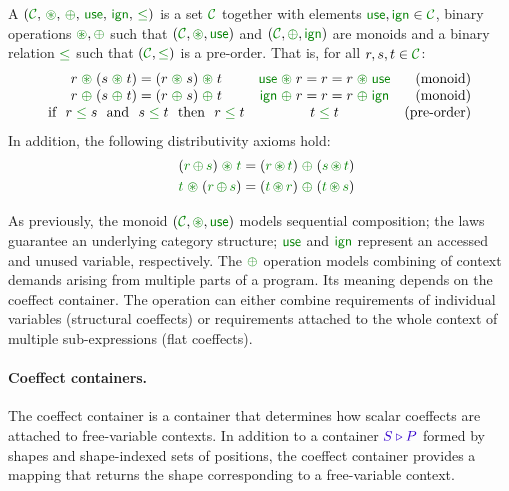 \begin{definition}
\label{def:unified-scal}
A \emph{} $(\C, \,\cseq, \,\cpar, \,\cunit, \,\czero, \,\cleq)$ is a set
$\C$ together with elements $\cunit, \czero \in \C$, binary operations $\cseq, \cpar$ such that
$(\C, \cseq, \cunit)$ and $(\C, \cpar, \czero)$ are monoids and a binary relation $\cleq$ such
that $(\C, \cleq)$ is a pre-order. That is, for all $r,s,t\in \C$:
%
\begin{equation*}
\begin{array}{ccr}
r \;\cseq\; (s \;\cseq\; t) = (r \;\cseq\; s) \;\cseq\; t  &
\cunit \;\cseq\; r = r = r \;\cseq\; \cunit &
\textnormal{(monoid)}
\\
r \;\cpar\; (s \;\cpar\; t) = (r \;\cpar\; s) \;\cpar\; t &
\czero \;\cpar\; r = r = r \;\cpar\; \czero &
\textnormal{(monoid)}
\\
\textnormal{if}~~r\; \cleq\; s ~~\textnormal{and}~~s\; \cleq\; t~~\textnormal{then}~~r\; \cleq\; t&
t\; \cleq\; t &
\textnormal{(pre-order)}
\\
\end{array}
\end{equation*}
%
In addition, the following distributivity axioms hold:
\begin{align*}
\quad (\cclrd{r}\, \cpar\, \cclrd{s}) \;\cseq\; \cclrd{t} & = (\cclrd{r} \,\cseq\, \cclrd{t}) \;\cpar\; (\cclrd{s}\, \cseq\, \cclrd{t}) \\
\quad \cclrd{t} \;\cseq\; (\cclrd{r}\, \cpar\, \cclrd{s}) & = (\cclrd{t} \,\cseq\, \cclrd{r}) \;\cpar\; (\cclrd{t}\, \cseq\, \cclrd{s})
\end{align*}
\end{definition}

\noindent
As previously, the monoid $(\C,\cseq,\cunit)$ models sequential composition; the laws guarantee
an underlying category structure; $\cunit$ and $\czero$ represent an accessed and unused variable,
respectively. The $\cpar$ operation models combining of context demands arising from multiple parts of a
program. Its meaning depends on the coeffect container. The operation can either combine requirements
of individual variables (structural coeffects) or requirements attached to the whole context of
multiple sub-exp\-ressions (flat coeffects).

\paragraph{Coeffect containers.}
The coeffect container is a container that determines how scalar coeffects are attached to free-variable
contexts. In addition to a container $\SHP$ formed by shapes and shape-indexed sets of positions,
the coeffect container provides a mapping that returns the shape corresponding to a free-variable context.

